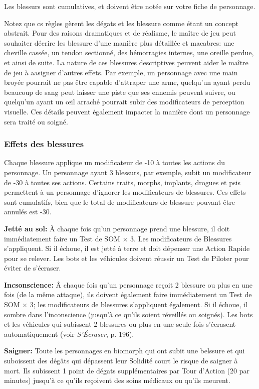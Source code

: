 Les blessurs sont cumulatives, et doivent être notée sur votre fiche de personnage. 

Notez que cs règles gèrent les dégats et les blessure comme étant un concept abstrait. Pour des raisons dramatiques et de réalisme, le maître de jeu peut souhaiter décrire les blessure d'une manière plus détaillée et macabres: une cheville cassée, un tendon sectionné, des hémorragies internes, une oreille perdue, et ainsi de suite. La nature de ces blessures descriptives peuvent aider le maître de jeu à aasigner d'autres effets. Par exemple, un personnage avec une main broyée pourrait ne pas être capable d'attraper une arme, quelqu'un ayant perdu beaucoup de sang peut laisser une piste que ses ennemis peuvent suivre, ou quelqu'un ayant un œil arraché pourrait subir des modificateurs de perception visuelle. Ces détails peuvent également impacter la manière dont un personnage sera traité ou soigné. 

\subsubsection{Effets des blessures} 

Chaque blessure applique un modificateur de -10 à toutes les actions du personnage. Un personnage ayant 3 blessurs, par exemple, subit un modificateur de -30 à toutes ses actions. Certains traits, morphs, implants, drogues et psis permettent à un personnage d'ignorer les modificateurs de blessures. Ces effets sont cumulatifs, bien que le total de modificateurs de blessure pouvant être annulés est -30. 

\textbf{Jetté au sol:} À chaque fois qu'un personnage prend une blessure, il doit immédiatement faire un Test de SOM $\times$ 3. Les modificateurs de Blessures s'appliquent. Si il échoue, il est jetté à terre et doit dépenser une Action Rapide pour se relever. Les bots et les véhicules doivent réussir un Test de Piloter pour éviter de s'écraser. 

\textbf{Incsonscience:} Â chaque fois qu'un personnage reçoit 2 blessure ou plus en une fois (de la même attaque), ils doivent également faire immédiatement un Test de SOM $\times$ 3; les modificateurs de blessures s'appliquent également. Si il échoue, il sombre dans l'inconscience (jusqu'à ce qu'ils soient réveillés ou soignés). Les bots et les véhicules qui subissent 2 blessures ou plus en une seule fois s'écrasent automatiquement (voir \emph{S'Écraser}, p. 196). 

\textbf{Saigner:} Toute les personnages en biomorph qui ont subit une belssure et qui suboissent des dégâts qui dépassent leur Solidité court le risque de saigner à mort. Ils subissent 1 point de dégats supplémentaires par Tour d'Action (20 par minutes) jusqu'à ce qu'ils reçoivent des soins médicaux ou qu'ils meurent. 

